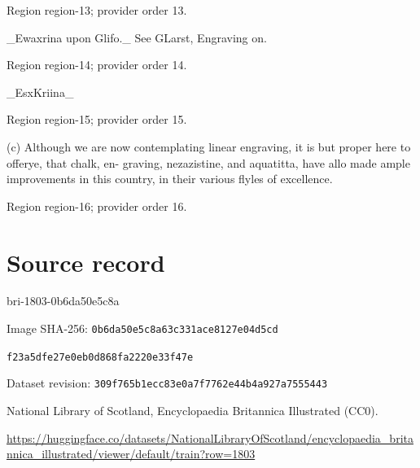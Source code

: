 \documentclass[11pt]{article}
\begin{document}
{\scriptsize\color{gray} Region region-13; provider order 13.\par}
\medskip

\_Ewaxrina upon Glifo.\_ See GLarst, Engraving on.
\par

{\scriptsize\color{gray} Region region-14; provider order 14.\par}
\medskip

\_EsxKriina\_
\par

{\scriptsize\color{gray} Region region-15; provider order 15.\par}
\medskip

(c) Although we are now contemplating linear engraving, it is but proper here to offerye, that chalk, en- graving, nezazistine, and aquatitta, have allo made ample improvements in this country, in their various flyles of excellence.
\par

{\scriptsize\color{gray} Region region-16; provider order 16.\par}
\medskip
\newpage\section*{Source record}
bri-1803-0b6da50e5c8a\par
Image SHA-256: \texttt{0b6da50e5c8a63c331ace8127e04d5cd}\par\texttt{f23a5dfe27e0eb0d868fa2220e33f47e}\par
Dataset revision: \texttt{309f765b1ecc83e0a7f7}\texttt{762e44b4a927a7555443}\par
National Library of Scotland, Encyclopaedia Britannica Illustrated (CC0).\par
\url{https://huggingface.co/datasets/NationalLibraryOfScotland/encyclopaedia_britannica_illustrated/viewer/default/train?row=1803}
\end{document}
